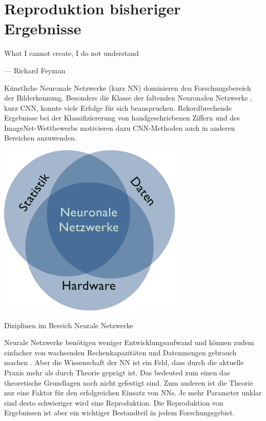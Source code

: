 \chapter{Reproduktion bisheriger Ergebnisse}
\label{chap:reproduktion}
\epigraph{What I cannot create, I do not understand}{--- Richard Feyman}

Künstliche Neuronale Netzwerke (kurz NN) dominieren den Forschungsbereich der 
Bilderkennung. 
Besonders die Klasse der faltenden Neuronalen Netzwerks , kurz CNN, konnte viele Erfolge für sich beanspruchen.
Rekordbrechende Ergebnisse bei der Klassifiziererung von handgeschriebenen Ziffern \parencite{LeCunBackpropagationappliedhandwritten1989} und des ImageNet-Wettbewerbs \parencite{KrizhevskyImageNetClassificationDeep2012a} motivieren dazu CNN-Methoden auch in anderen
Bereichen anzuwenden.

\begin{marginfigure}
    \includegraphics[width=\textwidth]{figures/tasks/nn_areas_venn.pdf}
    \caption{Diziplinen im Bereich Neurale Netzwerke}
    \label{fig:chen:cnn_task}
\end{marginfigure}
Neurale Netzwerke benötigen weniger Entwicklungsaufwand und können zudem einfacher von 
 wachsenden Rechenkapazitäten und Datenmengen gebrauch machen \parencite[436]{LeCunDeeplearning2015}. 
Aber die Wissenschaft der NN ist ein Feld, dass durch die aktuelle Praxis mehr als durch Theorie geprägt ist. 
Das bedeuted zum einen das theoretische Grundlagen noch nicht gefestigt sind.
Zum anderen ist die Theorie nur eine Faktor für den erfolgreichen Einsatz von NNs. 
Je mehr Parameter unklar sind desto schwieriger wird eine Reproduktion.
Die Reproduktion von Ergebnissen ist aber ein wichtiger Bestandteil in jedem Forschungsgebiet. 

